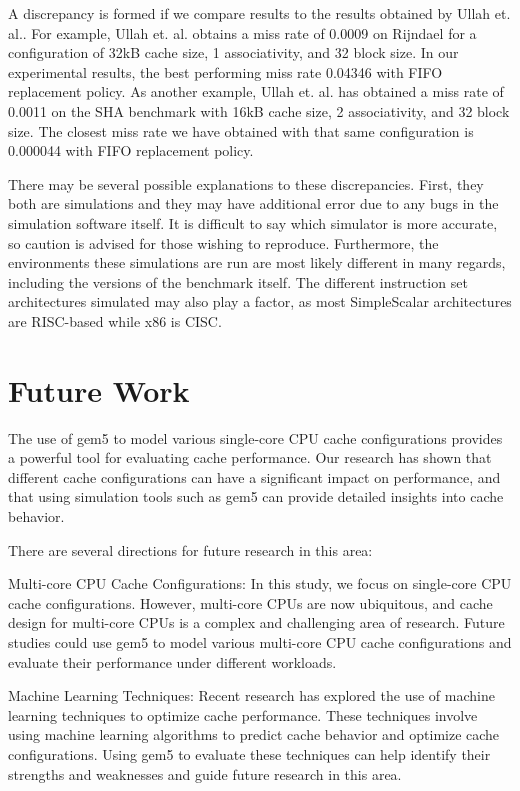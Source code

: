 \documentclass[conference]{IEEEtran}
\begin{document}
A discrepancy is formed if we compare results to the results obtained by Ullah et. al.. For example, Ullah et. al. obtains a miss rate of 0.0009 on Rijndael for a configuration of 32kB cache size, 1 associativity, and 32 block size. In our experimental results, the best performing miss rate 0.04346 with FIFO replacement policy. As another example, Ullah et. al. has obtained a miss rate of 0.0011 on the SHA benchmark with 16kB cache size, 2 associativity, and 32 block size. The closest miss rate we have obtained with that same configuration is 0.000044 with FIFO replacement policy.

There may be several possible explanations to these discrepancies. First, they both are simulations and they may have additional error due to any bugs in the simulation software itself. It is difficult to say which simulator is more accurate, so caution is advised for those wishing to reproduce. Furthermore, the environments these simulations are run are most likely different in many regards, including the versions of the benchmark itself. The different instruction set architectures simulated may also play a factor, as most SimpleScalar architectures are RISC-based while x86 is CISC.

\section{Future Work}
The use of gem5 to model various single-core CPU cache configurations provides a powerful tool for evaluating cache performance. Our research has shown that different cache configurations can have a significant impact on performance, and that using simulation tools such as gem5 can provide detailed insights into cache behavior.

There are several directions for future research in this area:

Multi-core CPU Cache Configurations: In this study, we focus on single-core CPU cache configurations. However, multi-core CPUs are now ubiquitous, and cache design for multi-core CPUs is a complex and challenging area of research. Future studies could use gem5 to model various multi-core CPU cache configurations and evaluate their performance under different workloads.

Machine Learning Techniques: Recent research has explored the use of machine learning techniques to optimize cache performance. These techniques involve using machine learning algorithms to predict cache behavior and optimize cache configurations. Using gem5 to evaluate these techniques can help identify their strengths and weaknesses and guide future research in this area.
\end{document}
